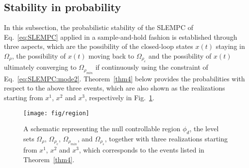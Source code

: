 \documentclass[letterpaper, 10pt, conference]{ieeeconf}
\begin{document}


\subsection{Stability in probability}
In this subsection, the probabilistic stability of the SLEMPC of Eq.~\ref{eq:SLEMPC} applied in a sample-and-hold fashion is established through three aspects, which are the possibility of the closed-loop states $x(t)$ staying in $\Omega_{\rho}$, the possibility of $x(t)$ moving back to $\Omega_{\rho_{e}}$ and the possibility of $x(t)$ ultimately converging to $\Omega_{\rho_{min}}$ if continuously using the constraint of Eq.~\ref{eq:SLEMPC:mode2}. Theorem~\ref{thm4} below provides the probabilities with respect to the above three events, which are also shown as the realizations starting from $x^1$, $x^2$ and $x^3$, respectively in Fig.~\ref{fig:region}.

\begin{figure}[!htb]
	\centering
	\texttt{[image: fig/region]}
	\vspace{-8pt}
	\caption{A schematic representing the null controllable region $\phi_{d}$, the level sets $\Omega_{\rho}$, $\Omega_{\rho_e}$, $\Omega_{\rho_{min}}$, and $\Omega_{\rho_s}$, together with three realizations starting from $x^1$, $x^2$ and $x^3$, which corresponds to the events listed in Theorem~\ref{thm4}.}
	\label{fig:region}
	\vspace{-6pt}
\end{figure}
\end{document}
